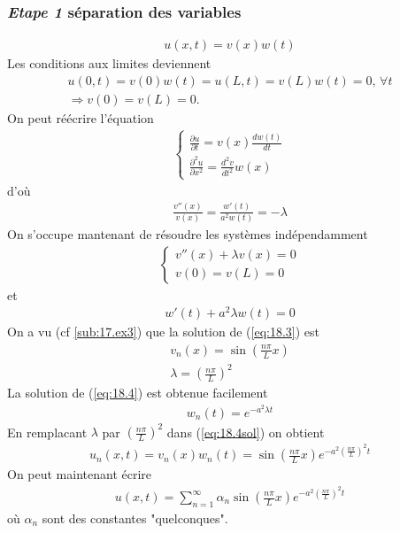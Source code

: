 \subsubsection{\emph{Etape 1} séparation des variables} 
\begin{eqnarray*}
	u(x,t)=v(x)w(t)
\end{eqnarray*}
Les conditions aux limites deviennent
\begin{eqnarray*}
	u(0,t)=v(0)w(t)=u(L,t)=v(L)w(t)=0, \,\forall t \\
	\Rightarrow v(0)=v(L)=0.
\end{eqnarray*}
On peut réécrire l'équation
\begin{eqnarray*}
	\begin{cases}
		\frac{\partial u}{\partial t}=v(x)\frac{dw(t)}{dt}
		\\
		\frac{\partial^2 u}{\partial x^2}=\frac{d^2v}{dt^2}w(x)
	\end{cases}
\end{eqnarray*}
d'où
\begin{eqnarray}
	\frac{v''(x)}{v(x)}=\frac{w'(t)}{a^2w(t)}=-\lambda 
\end{eqnarray}
On s'occupe mantenant de résoudre les systèmes indépendamment
\begin{eqnarray}
	\label{eq:18.3}
	\begin{cases}
		v''(x)+\lambda v(x)=0
		\\
		v(0)=v(L)=0
	\end{cases}
\end{eqnarray}
et
\begin{eqnarray}
	w'(t)+a^2\lambda w(t)=0
\end{eqnarray}
On a vu %
(cf \ref{sub:17.ex3}) que la solution de (\ref{eq:18.3}) est
\begin{eqnarray}
	v_n(x)=\sin{(\frac{n\pi}{L}x)}
	\\
	\lambda=(\frac{n\pi}{L})^2
\end{eqnarray}
La solution de (\ref{eq:18.4}) est obtenue facilement
\begin{eqnarray}
	\label{eq:18.4sol}
	w_n(t)=e^{-a^2\lambda t} 
\end{eqnarray}
En remplacant $\lambda$ par $(\frac{n\pi}{L})^2$ dans (\ref{eq:18.4sol}) on obtient
\begin{eqnarray}
	u_n(x,t)=v_n(x)w_n(t)=\sin{(\frac{n\pi}{L}x)}e^{-a^2(\frac{n\pi}{L})^2t} 
\end{eqnarray}
On peut maintenant écrire
\begin{eqnarray}
	u(x,t)=\sum_{n=1}^\infty\alpha_n\sin{(\frac{n\pi}{L}x)}e^{-a^2(\frac{n\pi}{L})^2t} 
\end{eqnarray} 
où $\alpha_n$ sont des constantes "quelconques".
